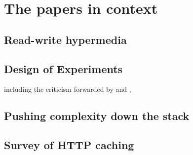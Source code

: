 \section{The papers in context}

\subsection{Read-write hypermedia}\label{sec:conlapis}

\subsection{Design of Experiments}\label{sec:condoe}

including the criticism forwarded by
\cite{Duan:2011:AOC:1989323.1989340} and \cite{MontoyaVCRA12},

\subsection{Pushing complexity down the stack}\label{sec:conpush}

\subsection{Survey of HTTP caching}\label{sec:consanity}
